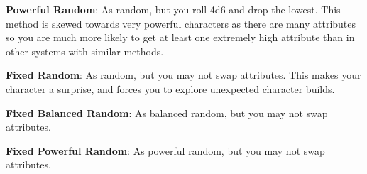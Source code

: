\begin{multicols*}{2}
    \textbf{Powerful Random}: As random, but you roll 4d6 and drop the lowest.
    This method is skewed towards very powerful characters as there are many
    attributes so you are much more likely to get at least one extremely high
    attribute than in other systems with similar methods.

    \textbf{Fixed Random}: As random, but you may not swap attributes. This
    makes your character a surprise, and forces you to explore unexpected
    character builds.

    \textbf{Fixed Balanced Random}: As balanced random, but you may not swap
    attributes.

    \textbf{Fixed Powerful Random}: As powerful random, but you may not swap
    attributes.

\end{multicols*}




